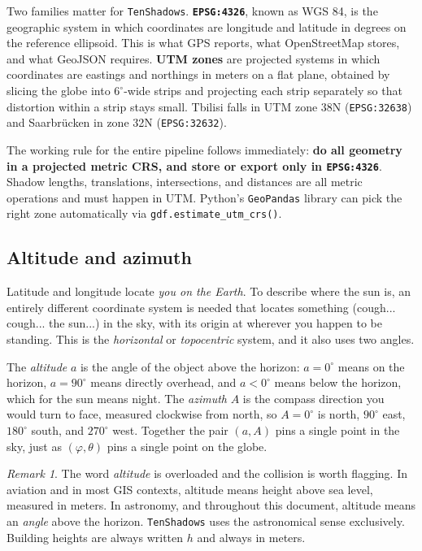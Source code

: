 \documentclass[11pt,a4paper]{article}
\theoremstyle{plain}
\theoremstyle{definition}
\theoremstyle{remark}
\newtheorem{remark}{Remark}
\begin{document}
Two families matter for \texttt{TenShadows}. \textbf{\texttt{EPSG:4326}}, known as WGS 84, is the geographic system in which coordinates are longitude and latitude in degrees on the reference ellipsoid. This is what GPS reports, what OpenStreetMap stores, and what GeoJSON requires. \textbf{UTM zones} are projected systems in which coordinates are eastings and northings in meters on a flat plane, obtained by slicing the globe into $6^\circ$-wide strips and projecting each strip separately so that distortion within a strip stays small. Tbilisi falls in UTM zone 38N (\texttt{EPSG:32638}) and Saarbr\"ucken in zone 32N (\texttt{EPSG:32632}).

The working rule for the entire pipeline follows immediately: \textbf{do all geometry in a projected metric CRS, and store or export only in \texttt{EPSG:4326}}. Shadow lengths, translations, intersections, and distances are all metric operations and must happen in UTM. Python's \texttt{GeoPandas} library can pick the right zone automatically via \texttt{gdf.estimate\_utm\_crs()}.

\subsection{Altitude and azimuth}

Latitude and longitude locate \emph{you on the Earth}. To describe where the sun is, an entirely different coordinate system is needed that locates something (cough... cough... the sun...) in the sky, with its origin at wherever you happen to be standing. This is the \emph{horizontal} or \emph{topocentric} system, and it also uses two angles.

The \emph{altitude} $a$ is the angle of the object above the horizon: $a = 0^\circ$ means on the horizon, $a = 90^\circ$ means directly overhead, and $a < 0^\circ$ means below the horizon, which for the sun means night. The \emph{azimuth} $A$ is the compass direction you would turn to face, measured clockwise from north, so $A = 0^\circ$ is north, $90^\circ$ east, $180^\circ$ south, and $270^\circ$ west. Together the pair $(a, A)$ pins a single point in the sky, just as $(\varphi, \theta)$ pins a single point on the globe.

\begin{remark}
The word \emph{altitude} is overloaded and the collision is worth flagging. In aviation and in most GIS contexts, altitude means height above sea level, measured in meters. In astronomy, and throughout this document, altitude means an \emph{angle} above the horizon. \texttt{TenShadows} uses the astronomical sense exclusively. Building heights are always written $h$ and always in meters.
\end{remark}
\end{document}
